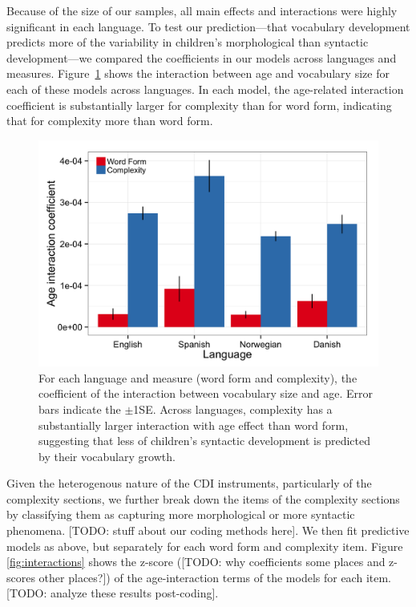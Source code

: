 \documentclass[10pt,letterpaper]{article}
\begin{document}
Because of the size of our samples, all main effects and interactions were highly significant in each language. To test our prediction---that vocabulary development predicts more of the variability in children's morphological than syntactic development---we compared the coefficients in our models across languages and measures. Figure~\ref{fig:coefs_grammar} shows the interaction between age and vocabulary size for each of these models across languages. In each model, the age-related interaction coefficient is substantially larger for complexity than for word form, indicating that for complexity more than word form.

\begin{figure}[tb]
\begin{center}
\includegraphics[width=\linewidth]{plots/coefs_wordform_complexity.png}
\end{center}
\caption{\label{fig:coefs_grammar}  For each language and measure (word form and complexity), the coefficient of the interaction between vocabulary size and age. Error bars indicate the $\pm$1SE. Across languages, complexity has a substantially larger interaction with age effect than word form, suggesting that less of children's syntactic development is predicted by their vocabulary growth.} 
\end{figure}

Given the heterogenous nature of the CDI instruments, particularly of the complexity sections, we further break down the items of the complexity sections by classifying them as capturing more morphological or more syntactic phenomena. [TODO: stuff about our coding methods here]. We then fit predictive models as above, but separately for each word form and complexity item. Figure \ref{fig:interactions} shows the z-score ([TODO: why coefficients some places and z-scores other places?]) of the age-interaction terms of the models for each item. [TODO: analyze these results post-coding].
\end{document}
